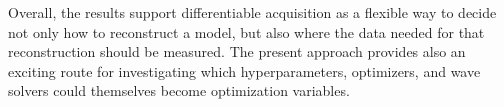 
Overall, the results support differentiable acquisition as a flexible way to
decide not only how to reconstruct a model, but also where the data needed for
that reconstruction should be measured. The present approach provides also an exciting route for
investigating which hyperparameters, optimizers, and wave solvers could
themselves become optimization variables.





